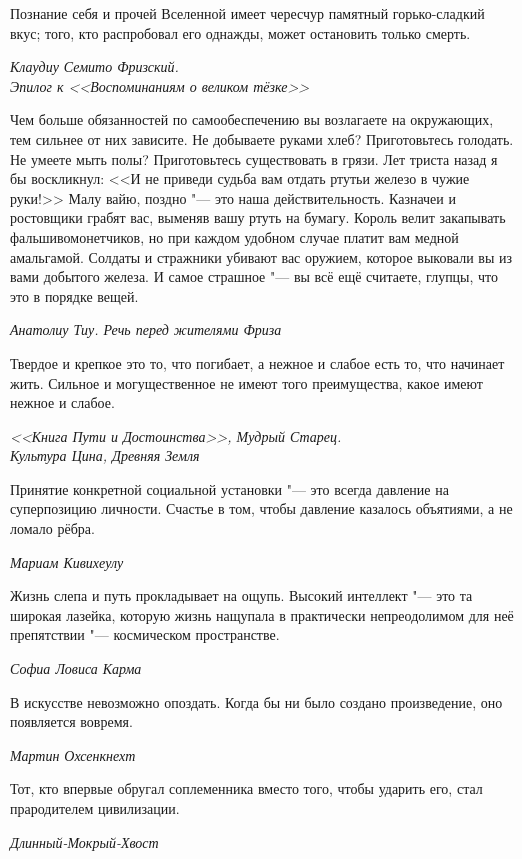 \documentclass[a4paper,10pt]{book}
\begin{document}
\epigraph{Познание себя и прочей Вселенной имеет чересчур памятный 
горько-сладкий вкус; того, кто распробовал его однажды, может остановить только 
смерть.}
{\textit{Клаудиу Семито Фризский.\\Эпилог к <<Воспоминаниям о великом тёзке>>}}

\epigraph{Чем больше обязанностей по самообеспечению вы возлагаете на 
окружающих, тем 
сильнее от них зависите. Не добываете руками хлеб? Приготовьтесь 
голодать. Не умеете мыть полы? Приготовьтесь существовать в грязи. Лет триста 
назад я бы воскликнул: <<И не приведи судьба вам отдать ртуть\footnotemark[3] и 
железо в чужие
руки!>> Малу вайю\footnotemark[4], поздно "--- это наша 
действительность. Казначеи и ростовщики грабят вас, выменяв вашу ртуть на 
бумагу. Король велит закапывать фальшивомонетчиков, но при каждом удобном случае
платит вам медной амальгамой. Солдаты и стражники убивают вас оружием, которое 
выковали вы из вами 
добытого железа. И самое страшное "--- вы всё ещё считаете, глупцы, что это в 
порядке вещей.}
{\textit{Анатолиу Тиу. Речь перед жителями Фриза}}

\epigraph{Твердое и крепкое это то, что погибает, а нежное и слабое есть то,
что начинает жить. Сильное и могущественное не имеют того
преимущества, какое имеют нежное и слабое.}
{\textit{<<Книга Пути и Достоинства>>, Мудрый Старец.\\Культура 
Цина, Древняя Земля}}

\epigraph{Принятие конкретной социальной установки "--- это всегда давление на 
суперпозицию личности. 
Счастье в том, чтобы давление казалось объятиями, а не ломало рёбра.}
{\textit{Мариам Кивихеулу}}

\epigraph{Жизнь слепа и путь прокладывает на ощупь. Высокий интеллект "--- это 
та 
широкая лазейка, которую жизнь нащупала в практически непреодолимом для неё 
препятствии "--- космическом пространстве.}
{\textit{Софиа Ловиса Карма}}

\epigraph{В искусстве невозможно опоздать. Когда бы ни было создано 
произведение, оно появляется вовремя.}
{\textit{Мартин Охсенкнехт}}

\epigraph{Тот, кто впервые обругал соплеменника вместо того, чтобы ударить его, 
стал прародителем цивилизации.}
{\textit{Длинный-Мокрый-Хвост}}
\end{document}
